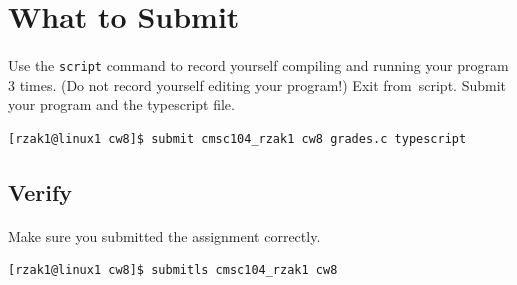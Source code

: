 \documentclass[letter,11pt]{article}
\begin{document}
\section*{What to Submit}
\paragraph{}Use the \texttt{script} command to record yourself compiling and running your program 3 times. (Do not record yourself editing your program!) Exit from script. Submit your program and the typescript file.
\begin{verbatim}
[rzak1@linux1 cw8]$ submit cmsc104_rzak1 cw8 grades.c typescript
\end{verbatim}

\subsection*{Verify}
\paragraph{}Make sure you submitted the assignment correctly.
\begin{verbatim}
[rzak1@linux1 cw8]$ submitls cmsc104_rzak1 cw8
\end{verbatim}
\end{document}
